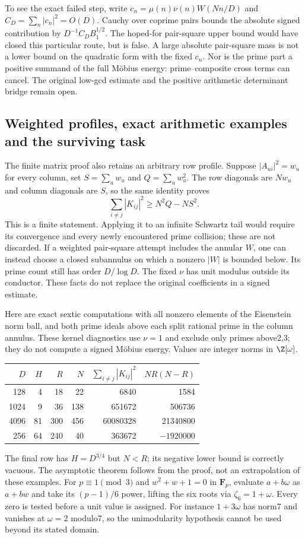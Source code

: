 \documentclass[11pt,oneside,openany]{book}
\theoremstyle{definition}\newtheorem{definition}[theorem]{Definition}
\theoremstyle{remark}\newtheorem{remark}[theorem]{Remark}
\begin{document}
To see the exact failed step, write $c_n=\mu(n)\nu(n)W(Nn/D)$ and
$C_D=\sum_n|c_n|^2=O(D)$. Cauchy over coprime pairs bounds the absolute
signed contribution by $D^{-1}C_DB_1^{1/2}$. The hoped-for pair-square
upper bound would have closed this particular route, but is false.
A large absolute pair-square mass is not a lower bound on the quadratic
form with the fixed $c_n$. Nor is the prime part a positive summand of the
full M\"obius energy: prime--composite cross terms can cancel. The original
low-gcd estimate and the positive arithmetic determinant bridge remain open.

\subsection{Weighted profiles, exact arithmetic examples and the surviving task}
The finite matrix proof also retains an arbitrary row profile. Suppose
$|A_{ui}|^2=w_u$ for every column, set $S=\sum_u w_u$ and
$Q=\sum_u w_u^2$. The row diagonals are $Nw_u$ and column diagonals are
$S$, so the same identity proves
\[
 \sum_{i\ne j}|K_{ij}|^2\ge N^2Q-NS^2.
\]
This is a finite statement. Applying it to an infinite Schwartz tail would
require its convergence and every newly encountered prime collision;
these are not discarded. If a weighted pair-square attempt includes the
annular $W$, one can instead choose a closed subannulus on which a nonzero
$|W|$ is bounded below. Its prime count still has order $D/\log D$.
The fixed $\nu$ has unit modulus outside its conductor. These facts do not
replace the original coefficients in a signed estimate.

Here are exact sextic computations with all nonzero elements of the
Eisenstein norm ball, and both prime ideals above each split rational prime
in the column annulus. These kernel diagnostics use $\nu=1$ and exclude
only primes above2,3; they do not compute a signed M\"obius energy.
Values are integer norms in $\Z[\omega]$.
\begin{center}\small
\begin{tabular}{rrrrrr}
$D$&$H$&$R$&$N$&$\sum_{i\ne j}|K_{ij}|^2$&$NR(N-R)$\\\hline
128&4&18&22&6840&1584\\
1024&9&36&138&651672&506736\\
4096&81&300&456&60080328&21340800\\
256&64&240&40&363672&$-1920000$
\end{tabular}
\end{center}
The final row has $H=D^{3/4}$ but $N<R$; its negative lower bound is
correctly vacuous. The asymptotic theorem follows from the proof, not an
extrapolation of these examples. For $p\equiv1\pmod3$ and
$w^2+w+1=0$ in $\mathbf F_p$, evaluate $a+b\omega$ as $a+bw$ and take
its $(p-1)/6$ power, lifting the six roots via $\zeta_6=1+\omega$.
Every zero is tested before a unit value is assigned. For instance
$1+3\omega$ has norm7 and vanishes at $\omega=2$ modulo7, so the
unimodularity hypothesis cannot be used beyond its stated domain.
\end{document}
